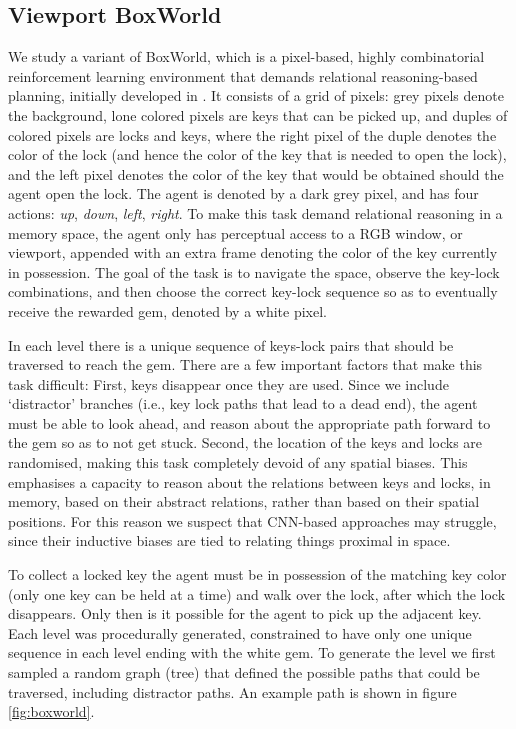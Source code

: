 \documentclass{article}
\begin{document}
\subsection{Viewport BoxWorld}
We study a variant of BoxWorld, which is a pixel-based, highly combinatorial reinforcement learning environment that demands relational reasoning-based planning, initially developed in \cite{zambaldi2018relational}. It consists of a grid of  pixels: grey pixels denote the background, lone colored pixels are keys that can be picked up, and duples of colored pixels are locks and keys, where the right pixel of the duple denotes the color of the lock (and hence the color of the key that is needed to open the lock), and the left pixel denotes the color of the key that would be obtained should the agent open the lock. The agent is denoted by a dark grey pixel, and has four actions: \textit{up}, \textit{down}, \textit{left}, \textit{right}. To make this task demand relational reasoning in a memory space, the agent only has perceptual access to a  RGB window, or viewport, appended with an extra frame denoting the color of the key currently in possession. The goal of the task is to navigate the space, observe the key-lock combinations, and then choose the correct key-lock sequence so as to eventually receive the rewarded gem, denoted by a white pixel. 

In each level there is a unique sequence of keys-lock pairs that should be traversed to reach the gem. There are a few important factors that make this task difficult: First, keys disappear once they are used. Since we include `distractor' branches (i.e., key lock paths that lead to a dead end), the agent must be able to look ahead, and reason about the appropriate path forward to the gem so as to not get stuck. Second, the location of the keys and locks are randomised, making this task completely devoid of any spatial biases. This emphasises a capacity to reason about the relations between keys and locks, in memory, based on their abstract relations, rather than based on their spatial positions. For this reason we suspect that CNN-based approaches may struggle, since their inductive biases are tied to relating things proximal in space. 

To collect a locked key the agent must be in possession of the matching key color (only one key can be held at a time) and walk over the lock, after which the lock disappears. Only then is it possible for the agent to pick up the adjacent key. Each level was procedurally generated, constrained to have only one unique sequence in each level ending with the white gem. To generate the level we first sampled a random graph (tree) that defined the possible paths that could be traversed, including distractor paths. An example path is shown in figure \ref{fig:boxworld}.
\end{document}
